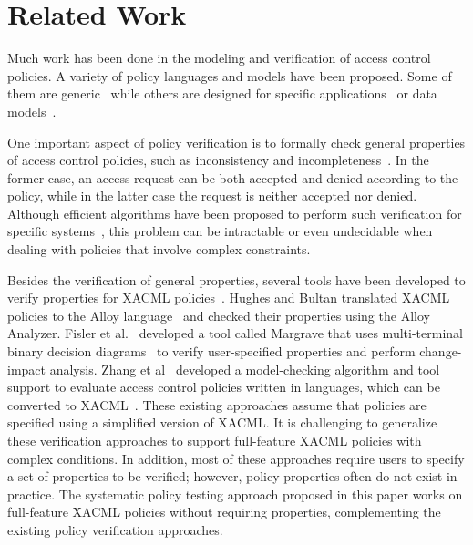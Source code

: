 \section{Related Work}
\label{sec:related}

Much work has been done in the modeling and verification of access
control policies. A variety of policy languages and models have been
proposed. Some of them are generic~\cite{oasis05:xacml,
jajodia97:logical,jajodia97:unified,damianou01:ponder,sandhu99:arbac}
while others are designed for specific
applications~\cite{bussler95:policy,ryutov00:representation,sirer02:access,anderson96:security}
or data
models~\cite{bertino99:logical,kudo00:xml,bertino01:specifying,griffiths76:authorization}.

One important aspect of policy verification is to formally check
general properties of access control policies, such as inconsistency
and
incompleteness~\cite{lupu99:conflict,kudo00:xml,jajodia97:logical,bonatti00:modular}.
In the former case, an access request can be both accepted and
denied according to the policy, while in the latter case the request
is neither accepted nor denied.  Although efficient algorithms have
been proposed to perform such verification for specific
systems~\cite{jajodia97:unified,jaeger03:policy}, this problem can
be intractable or even undecidable when dealing with policies that
involve complex constraints.

Besides the verification of general properties, several tools have
been developed to verify properties for XACML
policies~\cite{oasis05:xacml}. Hughes and Bultan translated XACML
policies to the Alloy language~\cite{jackson01:micromodularity} and
checked their properties using the Alloy Analyzer. Fisler et
al.~\cite{fisler05:verification} developed a tool called Margrave
that uses multi-terminal binary decision
diagrams~\cite{clarke93:multi} to verify user-specified properties
and perform change-impact analysis. Zhang et
al~\cite{zhang05:evaluating} developed a model-checking algorithm
and tool support to evaluate access control policies written in
 languages, which can be converted to
XACML~\cite{zhang04:synthesis}. These existing approaches assume
that policies are specified using a simplified version of XACML. It
is challenging to generalize these verification approaches to
support full-feature XACML policies with complex conditions. In
addition, most of these approaches require users to specify a set of
properties to be verified; however, policy properties often do not
exist in practice. The systematic policy testing approach proposed
in this paper works on full-feature XACML policies without requiring
properties, complementing the existing policy verification
approaches.

